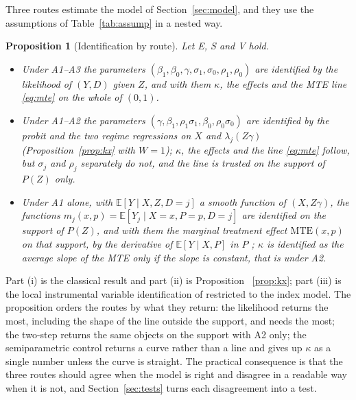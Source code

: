 \documentclass[11pt,a4paper]{article}
\theoremstyle{plain}
\newtheorem{proposition}{Proposition}
\theoremstyle{definition}
\theoremstyle{remark}
\newcommand{\E}{\mathbb{E}}
\newcommand{\MTE}{\mathrm{MTE}}
\newcommand{\1}{\mathbf{1}}
\begin{document}
Three routes estimate the model of Section~\ref{sec:model}, and they use
the assumptions of Table~\ref{tab:assump} in a nested way.

\begin{proposition}[Identification by route]\label{prop:routes}
Let E, S and V hold.
\begin{itemize}
\item[(i)] Under A1--A3 the parameters $(\beta_1,\beta_0,\gamma,\sigma_1,\sigma_0,\rho_1,\rho_0)$
are identified by the likelihood of $(Y,D)$ given $Z$, and with them
$\kappa$, the effects and the MTE line \eqref{eq:mte} on the whole of
$(0,1)$.
\item[(ii)] Under A1--A2 the parameters $(\gamma,\beta_1,\rho_1\sigma_1,\beta_0,\rho_0\sigma_0)$
are identified by the probit and the two regime regressions on $X$ and
$\lambda_j(Z\gamma)$ (Proposition~\ref{prop:kx} with $W=1$); $\kappa$, the
effects and the line \eqref{eq:mte} follow, but $\sigma_j$ and $\rho_j$
separately do not, and the line is trusted on the support of $P(Z)$ only.
\item[(iii)] Under A1 alone, with $\E[Y\mid X,Z,D=j]$ a smooth function of
$(X,Z\gamma)$, the functions $m_j(x,p)=\E[Y_j\mid X=x,P=p,D=j]$ are
identified on the support of $P(Z)$, and with them the marginal treatment
effect $\MTE(x,p)$ on that support, by the derivative of
$\E[Y\mid X,P]$ in $P$ \citep{heckman2005}; $\kappa$ is identified as the
average slope of the MTE only if the slope is constant, that is under A2.
\end{itemize}
\end{proposition}

Part (i) is the classical result and part (ii) is Proposition~%
\ref{prop:kx}; part (iii) is the local instrumental variable
identification of \citet{heckman2005} restricted to the index model. The
proposition orders the routes by what they return: the likelihood returns
the most, including the shape of the line outside the support, and needs
the most; the two-step returns the same objects on the support with A2
only; the semiparametric control returns a curve rather than a line and
gives up $\kappa$ as a single number unless the curve is straight. The
practical consequence is that the three routes should agree when the model
is right and disagree in a readable way when it is not, and
Section~\ref{sec:tests} turns each disagreement into a test.
\end{document}

